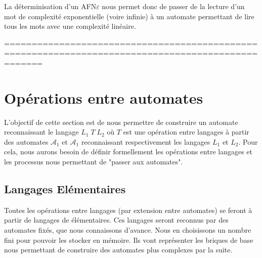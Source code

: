 \begin{example}[Déterminisation]
\begin{enumerate}
\begin{center}
\begin{minipage}{0.45\textwidth}
                \end{minipage}
            \end{center}
    \end{enumerate}
\end{example}

La déterminisation d'un AFN$\varepsilon$ nous permet donc de passer de la lecture d'un mot de complexité 
exponentielle (voire infinie) à un automate permettant de lire tous les mots avec une complexité linéaire. 


===================================================================================================

\section{Opérations entre automates}

L'objectif de cette section est de nous permettre de construire un automate reconnaissant le langage $L_1 \; T \; L_2$ 
où $T$ est une opération entre langages à partir des automates $ \mathcal{A}_1$ et $ \mathcal{A}_1$ reconnaissant 
respectivement les langages $L_1$ et $L_2$.
Pour cela, nous aurons besoin de définir formellement les opérations entre langages et les processus 
nous permettant de "passer aux automates".      

\subsection{Langages Elémentaires}

Toutes les opérations entre langages (par extension entre automates) se feront à partir de langages de 
élémentaires. 
Ces langages seront reconnus par des automates fixés, que nous connaissons d'avance. Nous en choisissons un nombre fini 
pour pouvoir les stocker en mémoire. Ils vont représenter les briques de base nous permettant de construire des automates plus 
complexes par la suite. 

